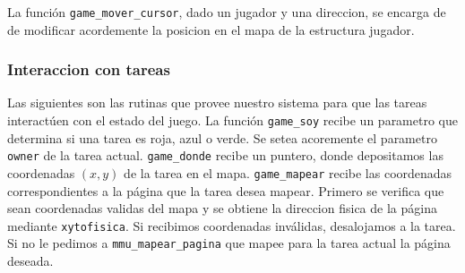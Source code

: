 La función \verb|game_mover_cursor|, dado un jugador y una direccion, se encarga de de modificar acordemente la posicion en el mapa de la estructura jugador.

\subsubsection{Interaccion con tareas}

Las siguientes son las rutinas que provee nuestro sistema para que las tareas interactúen con el estado del juego.
La función \verb|game_soy| recibe un parametro que determina si una tarea es roja, azul o verde. Se setea acoremente el parametro \verb|owner| de la tarea actual.
\verb|game_donde| recibe un puntero, donde depositamos las coordenadas $(x,y)$ de la tarea en el mapa.
\verb|game_mapear| recibe las coordenadas correspondientes a la página que la tarea desea mapear. Primero se verifica que sean coordenadas validas del mapa y se obtiene la direccion fisica de la página mediante \verb|xytofisica|. Si recibimos coordenadas inválidas, desalojamos a la tarea. Si no le pedimos a \verb|mmu_mapear_pagina| que mapee para la tarea actual la página deseada.


